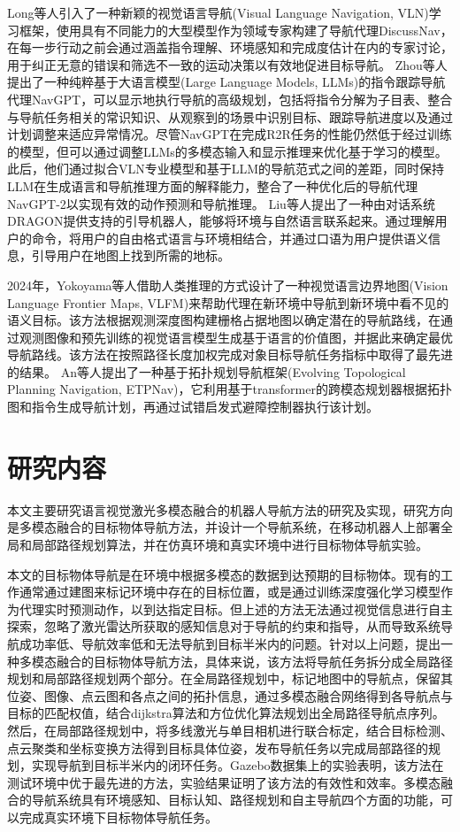 	
	Long\cite{long2024discuss}等人引入了一种新颖的视觉语言导航(Visual Language Navigation, VLN)学习框架，使用具有不同能力的大型模型作为领域专家构建了导航代理DiscussNav，在每一步行动之前会通过涵盖指令理解、环境感知和完成度估计在内的专家讨论，用于纠正无意的错误和筛选不一致的运动决策以有效地促进目标导航。
	Zhou\cite{zhou2024navgpt}等人提出了一种纯粹基于大语言模型(Large Language Models, LLMs)的指令跟踪导航代理NavGPT，可以显示地执行导航的高级规划，包括将指令分解为子目表、整合与导航任务相关的常识知识、从观察到的场景中识别目标、跟踪导航进度以及通过计划调整来适应异常情况。尽管NavGPT在完成R2R任务的性能仍然低于经过训练的模型，但可以通过调整LLMs的多模态输入和显示推理来优化基于学习的模型。此后，他们通过拟合VLN专业模型和基于LLM的导航范式之间的差距，同时保持LLM在生成语言和导航推理方面的解释能力，整合了一种优化后的导航代理NavGPT-2\cite{zhou2024navgpt}以实现有效的动作预测和导航推理。
	Liu\cite{liu2024dragon}等人提出了一种由对话系统DRAGON提供支持的引导机器人，能够将环境与自然语言联系起来。通过理解用户的命令，将用户的自由格式语言与环境相结合，并通过口语为用户提供语义信息，引导用户在地图上找到所需的地标。


	2024年，Yokoyama\cite{yokoyama2024vlfm}等人借助人类推理的方式设计了一种视觉语言边界地图(Vision Language Frontier Maps, VLFM)来帮助代理在新环境中导航到新环境中看不见的语义目标。该方法根据观测深度图构建栅格占据地图以确定潜在的导航路线，在通过观测图像和预先训练的视觉语言模型生成基于语言的价值图，并据此来确定最优导航路线。该方法在按照路径长度加权完成对象目标导航任务指标中取得了最先进的结果。
	An\cite{an2024etpnav}等人提出了一种基于拓扑规划导航框架(Evolving Topological Planning Navigation, ETPNav)，它利用基于transformer的跨模态规划器根据拓扑图和指令生成导航计划，再通过试错启发式避障控制器执行该计划。



\section{研究内容}

	本文主要研究语言视觉激光多模态融合的机器人导航方法的研究及实现，研究方向是多模态融合的目标物体导航方法，并设计一个导航系统，在移动机器人上部署全局和局部路径规划算法，并在仿真环境和真实环境中进行目标物体导航实验。
	
	本文的目标物体导航是在环境中根据多模态的数据到达预期的目标物体。现有的工作通常通过建图来标记环境中存在的目标位置，或是通过训练深度强化学习模型作为代理实时预测动作，以到达指定目标。但上述的方法无法通过视觉信息进行自主探索，忽略了激光雷达所获取的感知信息对于导航的约束和指导，从而导致系统导航成功率低、导航效率低和无法导航到目标半米内的问题。针对以上问题，提出一种多模态融合的目标物体导航方法，具体来说，该方法将导航任务拆分成全局路径规划和局部路径规划两个部分。在全局路径规划中，标记地图中的导航点，保留其位姿、图像、点云图和各点之间的拓扑信息，通过多模态融合网络得到各导航点与目标的匹配权值，结合dijkstra算法和方位优化算法规划出全局路径导航点序列。然后，在局部路径规划中，将多线激光与单目相机进行联合标定，结合目标检测、点云聚类和坐标变换方法得到目标具体位姿，发布导航任务以完成局部路径的规划，实现导航到目标半米内的闭环任务。Gazebo数据集上的实验表明，该方法在测试环境中优于最先进的方法，实验结果证明了该方法的有效性和效率。多模态融合的导航系统具有环境感知、目标认知、路径规划和自主导航四个方面的功能，可以完成真实环境下目标物体导航任务。

